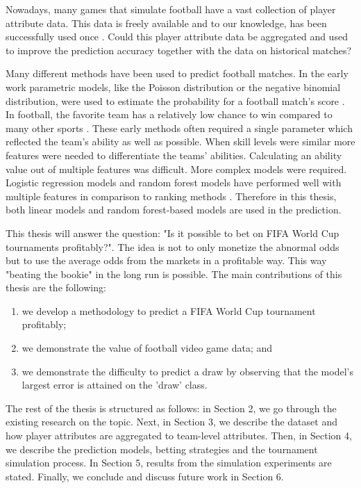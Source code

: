 Nowadays,  many games that simulate football have a vast collection of player attribute data. This data is freely available and to our knowledge, has been successfully used once \cite{shin2014novel}. Could this player attribute data be aggregated and used to improve the prediction accuracy together with the data on historical matches?

Many different methods have been used to predict football matches. In the early work parametric models, like the Poisson distribution or the negative binomial distribution, were used to estimate the probability for a football match's score \cite{moroney1962facts, dixon1997}. In football, the favorite team has a relatively low chance to win compared to many other sports \cite{anderson2013numbers}. These early methods often required a single parameter which reflected the team's ability as well as possible. When skill levels were similar more features were needed to differentiate the teams' abilities. Calculating an ability value out of multiple features was difficult. More complex models were required. Logistic regression models and random forest models have performed well with multiple features in comparison to ranking methods \cite{groll2018prediction, 10.1007/978-3-319-29504-6_48}. Therefore in this thesis, both linear models and random forest-based models are used in the prediction.

This thesis will answer the question: "Is it possible to bet on FIFA World Cup tournaments profitably?". The idea is not to only monetize the abnormal odds but to use the average odds from the markets in a profitable way. This way "beating the bookie" in the long run is possible. The main contributions of this thesis are the following:
\begin{enumerate}
  \item we develop a methodology to predict a FIFA World Cup tournament profitably;
  \item we demonstrate the value of football video game data; and
  \item we demonstrate the difficulty to predict a draw by observing that the model’s largest error is attained on the 'draw' class.
\end{enumerate}

The rest of the thesis is structured as follows: in Section 2, we go through the existing research on the topic. Next, in Section 3, we describe the dataset and how player attributes are aggregated to team-level attributes. Then, in Section 4, we describe the prediction models, betting strategies and the tournament simulation process. In Section 5, results from the simulation experiments are stated. Finally, we conclude and discuss future work in Section 6.